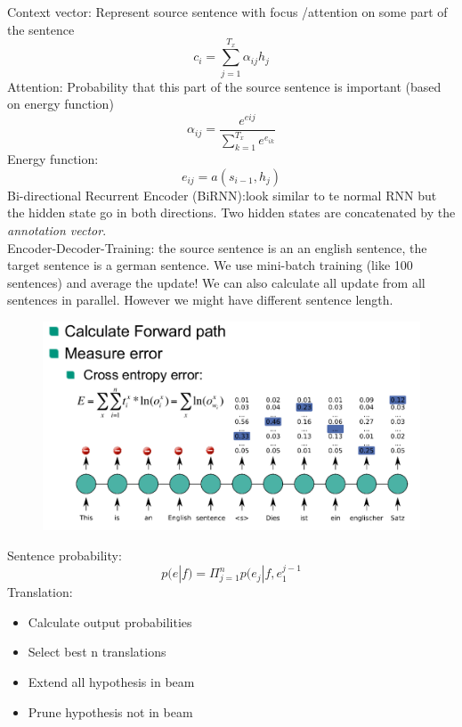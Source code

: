 Context vector: Represent source sentence with focus /attention on
some part of the sentence
\[
c_i = \sum_{j=1}^{T_x} \alpha_{ij}h_j
\]
Attention: Probability that this part of the source sentence is important (based on energy function)
\[
\alpha_{ij} = \frac{e^{eij}}{\sum_{k=1}^{T_x} e^{e_{ik}}}
\]
Energy function:
\[
e_{ij} = a(s_{i-1}, h_j)
\]
Bi-directional Recurrent Encoder (BiRNN):look similar to te normal RNN but the hidden state go in both directions. Two hidden states are concatenated by the \textit{annotation vector}.\\[1cm]
Encoder-Decoder-Training: the source sentence is an an english sentence, the target sentence is a german sentence. We use mini-batch training (like 100 sentences) and average the update! We can also calculate all update from all sentences in parallel. However we might have different sentence length.\\
\begin{figure}[h]
\includegraphics[scale=0.4]{edtraining}
\end{figure}
Sentence probability:
\[
p(e|f) = \Pi_{j=1}^n p(e_j|f, e_1^{j-1}
\]
Translation:
\begin{itemize}
	\item Calculate output probabilities
	\item Select best n translations
	\item Extend all hypothesis in beam
	\item Prune hypothesis not in beam
\end{itemize}



\newpage